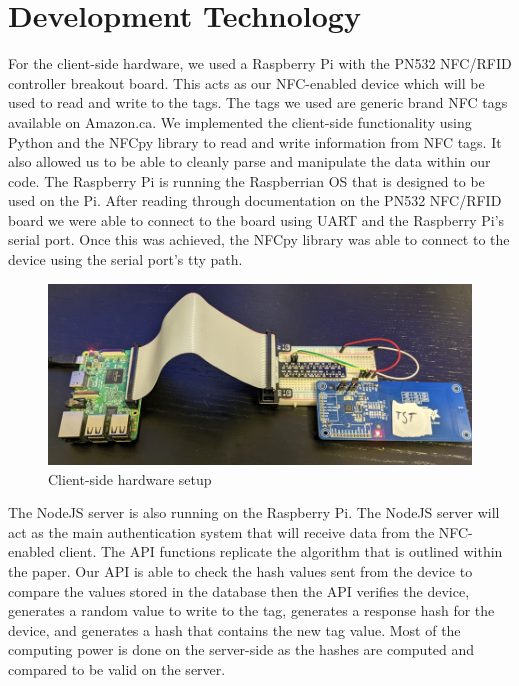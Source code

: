 \section{Development Technology}

For the client-side hardware, we used a Raspberry Pi with the PN532 NFC/RFID controller breakout board. This acts as our NFC-enabled device which will be used to read and write to the tags. The tags we used are generic brand NFC tags available on Amazon.ca. We implemented the client-side functionality using Python and the NFCpy library to read and write information from NFC tags. It also allowed us to be able to cleanly parse and manipulate the data within our code. The Raspberry Pi is running the Raspberrian OS that is designed to be used on the Pi. After reading through documentation on the PN532 NFC/RFID board we were able to connect to the board using UART and the Raspberry Pi’s serial port. Once this was achieved, the NFCpy library was able to connect to the device using the serial port’s tty path.

\begin{figure}[H]
    \centering
    \includegraphics[width=\textwidth]{figures/hardware_setup.png}
    \caption{Client-side hardware setup}
\end{figure}

The NodeJS server is also running on the Raspberry Pi. The NodeJS server will act as the main authentication system that will receive data from the NFC-enabled client. The API functions replicate the algorithm that is outlined within the paper. Our API is able to check the hash values sent from the device to compare the values stored in the database then the API verifies the device, generates a random value to write to the tag, generates a response hash for the device, and generates a hash that contains the new tag value. Most of the computing power is done on the server-side as the hashes are computed and compared to be valid on the server.

